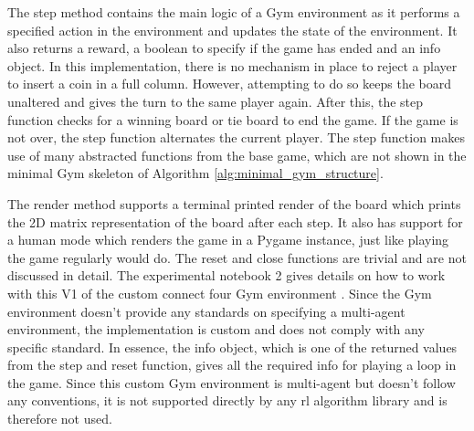 The step method contains the main logic of a Gym environment as it performs a specified action in the environment and updates the state of the environment.
It also returns a reward, a boolean to specify if the game has ended and an info object.
In this implementation, there is no mechanism in place to reject a player to insert a coin in a full column.
However, attempting to do so keeps the board unaltered and gives the turn to the same player again.
After this, the step function checks for a winning board or tie board to end the game.
If the game is not over, the step function alternates the current player.
The step function makes use of many abstracted functions from the base game, which are not shown in the minimal Gym skeleton of Algorithm \ref{alg:minimal_gym_structure}.

The render method supports a terminal printed render of the board which prints the 2D matrix representation of the board after each step.
It also has support for a human mode which renders the game in a Pygame instance, just like playing the game regularly would do.
The reset and close functions are trivial and are not discussed in detail. 
The experimental notebook 2 gives details on how to work with this V1 of the custom connect four Gym environment \citep{github_project}.
Since the Gym environment doesn't provide any standards on specifying a multi-agent environment, the implementation is custom and does not comply with any specific standard.
In essence, the info object, which is one of the returned values from the step and reset function, gives all the required info for playing a loop in the game.
Since this custom Gym environment is multi-agent but doesn't follow any conventions, it is not supported directly by any \gls{rl} algorithm library and is therefore not used.

